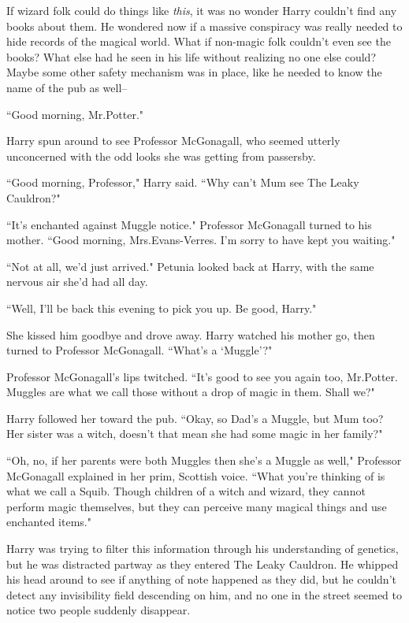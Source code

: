 If wizard folk could do things like \emph{this}, it was no wonder Harry couldn't find any books about them. He wondered now if a massive conspiracy was really needed to hide records of the magical world. What if non-magic folk couldn't even see the books? What else had he seen in his life without realizing no one else could? Maybe some other safety mechanism was in place, like he needed to know the name of the pub as well\---

``Good morning, Mr.\?Potter."

Harry spun around to see Professor McGonagall, who seemed utterly unconcerned with the odd looks she was getting from passersby.

``Good morning, Professor," Harry said. ``Why can't Mum see The Leaky Cauldron?"

``It's enchanted against Muggle notice." Professor McGonagall turned to his mother. ``Good morning, Mrs.\?Evans-Verres. I'm sorry to have kept you waiting."

``Not at all, we'd just arrived." Petunia looked back at Harry, with the same nervous air she'd had all day.

``Well, I'll be back this evening to pick you up. Be good, Harry."

She kissed him goodbye and drove away. Harry watched his mother go, then turned to Professor McGonagall. ``What's a `Muggle'?"

Professor McGonagall's lips twitched. ``It's good to see you again too, Mr.\?Potter. Muggles are what we call those without a drop of magic in them. Shall we?"

Harry followed her toward the pub. ``Okay, so Dad's a Muggle, but Mum too? Her sister was a witch, doesn't that mean she had some magic in her family?"

``Oh, no, if her parents were both Muggles then she's a Muggle as well," Professor McGonagall explained in her prim, Scottish voice. ``What you're thinking of is what we call a Squib. Though children of a witch and wizard, they cannot perform magic themselves, but they can perceive many magical things and use enchanted items."

Harry was trying to filter this information through his understanding of genetics, but he was distracted partway as they entered The Leaky Cauldron. He whipped his head around to see if anything of note happened as they did, but he couldn't detect any invisibility field descending on him, and no one in the street seemed to notice two people suddenly disappear.

